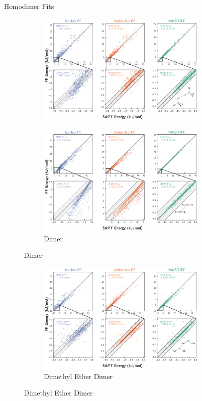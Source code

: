 \begin{section}{Homodimer Fits}
\begin{figure}
\begin{subfigure}{\textwidth}
        \includegraphics[width=0.9\textwidth]{anisotropic/si/homodimer_figures/chloromethane_chloromethane_comparison.pdf}
    \end{subfigure}
    \begin{subfigure}{\textwidth}
        \caption{\co Dimer}
        \includegraphics[width=0.9\textwidth]{anisotropic/si/homodimer_figures/co2_co2_comparison.pdf}
    \end{subfigure}
    \end{figure}
    \begin{figure}
    \ContinuedFloat
    \begin{subfigure}{\textwidth}
        \caption{Dimethyl Ether Dimer}
        \includegraphics[width=0.9\textwidth]{anisotropic/si/homodimer_figures/dimethyl_ether_dimethyl_ether_comparison.pdf}

\end{subfigure}
\end{figure}
\end{section}
